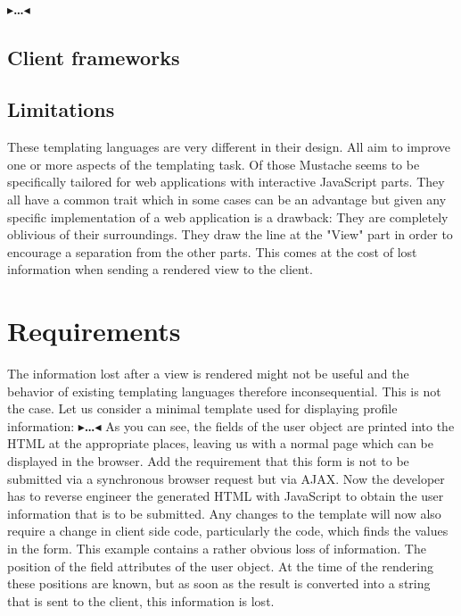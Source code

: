 \documentclass[twoside,11pt,openright]{report}
\newcommand{\todo}[1]{{\color[rgb]{.5,0,0}\textbf{$\blacktriangleright$#1$\blacktriangleleft$}}}
\begin{document}
\subsubsection{\todo{\dots}}
\section{Client frameworks}
\section{Limitations}
These templating languages are very different in their design.
All aim to improve one or more aspects of the templating task.
Of those Mustache seems to be specifically tailored for web applications
with interactive JavaScript parts.
They all have a common trait which in some cases can be an advantage
but given any specific implementation of a web application is a drawback:
They are completely oblivious of their surroundings. They draw the line
at the "View" part in order to encourage a separation from the other
parts. This comes at the cost of lost information when sending a
rendered view to the client.


\chapter{Requirements}
The information lost after a view is rendered might not be useful and
the behavior of existing templating languages therefore inconsequential.
This is not the case. Let us consider a minimal template used for
displaying profile information:
\todo{\dots}
As you can see, the fields of the user object are printed into the HTML
at the appropriate places, leaving us with a normal page which can be
displayed in the browser.
Add the requirement that this form is not to be submitted via a
synchronous browser request but via AJAX. Now the developer has to
reverse engineer the generated HTML with JavaScript to obtain the
user information that is to be submitted. Any changes to the template
will now also require a change in client side code, particularly the
code, which finds the values in the form.
This example contains a rather obvious loss of information.
The position of the field attributes of the user object.
At the time of the rendering these positions are known, but as soon as the
result is converted into a string that is sent to the client, this
information is lost.
\end{document}
